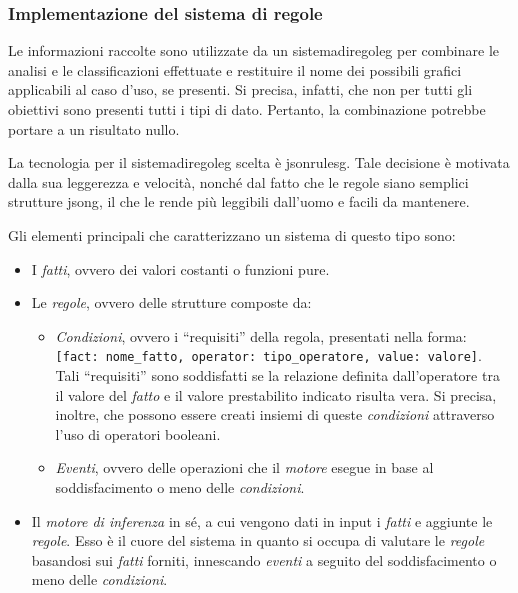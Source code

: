 \subsubsection{Implementazione del sistema di regole}\label{subsubsec:rules}
Le informazioni raccolte sono utilizzate da un \gls{sistemadiregoleg} per combinare le analisi e le classificazioni effettuate e restituire il nome dei possibili grafici applicabili al caso d'uso, se presenti.
Si precisa, infatti, che non per tutti gli obiettivi sono presenti tutti i tipi di dato. Pertanto, la combinazione potrebbe portare a un risultato nullo.

La tecnologia per il \gls{sistemadiregoleg} scelta è \gls{jsonrulesg}. Tale decisione è motivata dalla sua leggerezza e velocità, nonché dal fatto che le regole siano semplici strutture \gls{jsong}, 
il che le rende più leggibili dall'uomo e facili da mantenere.

\bigskip
\noindent Gli elementi principali che caratterizzano un sistema di questo tipo sono:
\begin{itemize}
    \item I \emph{fatti}, ovvero dei valori costanti o funzioni pure.
    \item Le \emph{regole}, ovvero delle strutture composte da:
    \begin{itemize}
        \item \emph{Condizioni}, ovvero i ``requisiti'' della regola, presentati nella forma:\\
        \texttt{[fact: nome\_fatto, operator: tipo\_operatore, value: valore]}. \\
        Tali ``requisiti'' sono soddisfatti se la relazione definita dall'operatore tra il valore del \emph{fatto} e il valore prestabilito 
        indicato risulta vera. Si precisa, inoltre, che possono essere creati insiemi di queste \emph{condizioni} attraverso l'uso di operatori booleani.
        \item \emph{Eventi}, ovvero delle operazioni che il \emph{motore} esegue in base al soddisfacimento o meno delle \emph{condizioni}. 
    \end{itemize}
    \item Il \emph{motore di inferenza} in sé, a cui vengono dati in input i \emph{fatti} e aggiunte le \emph{regole}. Esso è il cuore del sistema in quanto si occupa di valutare
    le \emph{regole} basandosi sui \emph{fatti} forniti, innescando \emph{eventi} a seguito del soddisfacimento o meno delle \emph{condizioni}.
\end{itemize}

